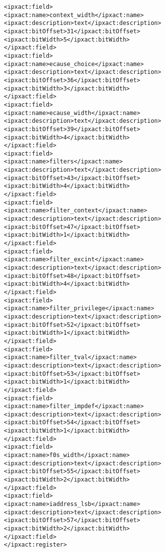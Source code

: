 \begin{alltt}
               <ipxact:field>
                  <ipxact:name>context_width</ipxact:name>
                  <ipxact:description>text</ipxact:description>
                  <ipxact:bitOffset>31</ipxact:bitOffset>
                  <ipxact:bitWidth>5</ipxact:bitWidth>
               </ipxact:field>
               <ipxact:field>
                  <ipxact:name>ecause_choice</ipxact:name>
                  <ipxact:description>text</ipxact:description>
                  <ipxact:bitOffset>36</ipxact:bitOffset>
                  <ipxact:bitWidth>3</ipxact:bitWidth>
               </ipxact:field>
               <ipxact:field>
                  <ipxact:name>ecause_width</ipxact:name>
                  <ipxact:description>text</ipxact:description>
                  <ipxact:bitOffset>39</ipxact:bitOffset>
                  <ipxact:bitWidth>4</ipxact:bitWidth>
               </ipxact:field>
               <ipxact:field>
                  <ipxact:name>filters</ipxact:name>
                  <ipxact:description>text</ipxact:description>
                  <ipxact:bitOffset>43</ipxact:bitOffset>
                  <ipxact:bitWidth>4</ipxact:bitWidth>
               </ipxact:field>
               <ipxact:field>
                  <ipxact:name>filter_context</ipxact:name>
                  <ipxact:description>text</ipxact:description>
                  <ipxact:bitOffset>47</ipxact:bitOffset>
                  <ipxact:bitWidth>1</ipxact:bitWidth>
               </ipxact:field>
               <ipxact:field>
                  <ipxact:name>filter_excint</ipxact:name>
                  <ipxact:description>text</ipxact:description>
                  <ipxact:bitOffset>48</ipxact:bitOffset>
                  <ipxact:bitWidth>4</ipxact:bitWidth>
               </ipxact:field>
               <ipxact:field>
                  <ipxact:name>filter_privilege</ipxact:name>
                  <ipxact:description>text</ipxact:description>
                  <ipxact:bitOffset>52</ipxact:bitOffset>
                  <ipxact:bitWidth>1</ipxact:bitWidth>
               </ipxact:field>
               <ipxact:field>
                  <ipxact:name>filter_tval</ipxact:name>
                  <ipxact:description>text</ipxact:description>
                  <ipxact:bitOffset>53</ipxact:bitOffset>
                  <ipxact:bitWidth>1</ipxact:bitWidth>
               </ipxact:field>
               <ipxact:field>
                  <ipxact:name>filter_impdef</ipxact:name>
                  <ipxact:description>text</ipxact:description>
                  <ipxact:bitOffset>54</ipxact:bitOffset>
                  <ipxact:bitWidth>1</ipxact:bitWidth>
               </ipxact:field>
               <ipxact:field>
                  <ipxact:name>f0s_width</ipxact:name>
                  <ipxact:description>text</ipxact:description>
                  <ipxact:bitOffset>55</ipxact:bitOffset>
                  <ipxact:bitWidth>2</ipxact:bitWidth>
               </ipxact:field>
               <ipxact:field>
                  <ipxact:name>iaddress_lsb</ipxact:name>
                  <ipxact:description>text</ipxact:description>
                  <ipxact:bitOffset>57</ipxact:bitOffset>
                  <ipxact:bitWidth>2</ipxact:bitWidth>
               </ipxact:field>
            </ipxact:register>



\end{alltt}
